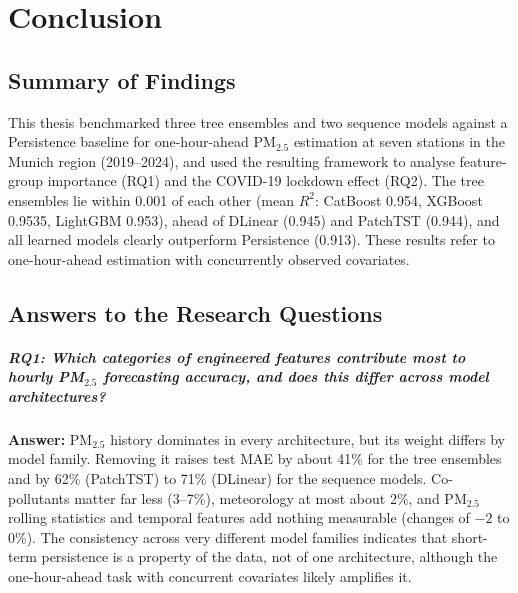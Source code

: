 \chapter{Conclusion}
\label{chapter:Conclusion}

\section{Summary of Findings}
\label{section:conclusion-summary}

This thesis benchmarked three tree ensembles and two sequence models against a Persistence baseline for one-hour-ahead PM$_{2.5}$ estimation at seven stations in the Munich region (2019--2024), and used the resulting framework to analyse feature-group importance (RQ1) and the COVID-19 lockdown effect (RQ2). The tree ensembles lie within 0.001 of each other (mean $R^2$: CatBoost 0.954, XGBoost 0.9535, LightGBM 0.953), ahead of DLinear (0.945) and PatchTST (0.944), and all learned models clearly outperform Persistence (0.913). These results refer to one-hour-ahead estimation with concurrently observed covariates.

\section{Answers to the Research Questions}
\label{section:conclusion-rq}

\paragraph{RQ1: Which categories of engineered features contribute most to hourly PM$_{2.5}$ forecasting accuracy, and does this differ across model architectures?}
\textbf{Answer:} PM$_{2.5}$ history dominates in every architecture, but its weight differs by model family. Removing it raises test MAE by about 41\% for the tree ensembles and by 62\% (PatchTST) to 71\% (DLinear) for the sequence models. Co-pollutants matter far less (3--7\%), meteorology at most about 2\%, and PM$_{2.5}$ rolling statistics and temporal features add nothing measurable (changes of $-2$ to $0$\%). The consistency across very different model families indicates that short-term persistence is a property of the data, not of one architecture, although the one-hour-ahead task with concurrent covariates likely amplifies it.

